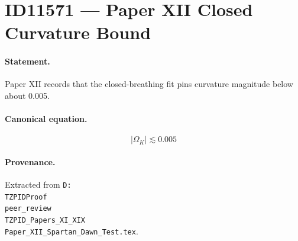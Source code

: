 \section*{ID11571 --- Paper XII Closed Curvature Bound}

\paragraph{Statement.}
Paper XII records that the closed-breathing fit pins curvature magnitude below about 0.005.

\paragraph{Canonical equation.}
\[
|\Omega_K|\lesssim0.005
\]

\paragraph{Provenance.}
Extracted from \texttt{D:\\TZPIDProof\\peer\_review\\TZPID\_Papers\_XI\_XIX\\Paper\_XII\_Spartan\_Dawn\_Test.tex}.
